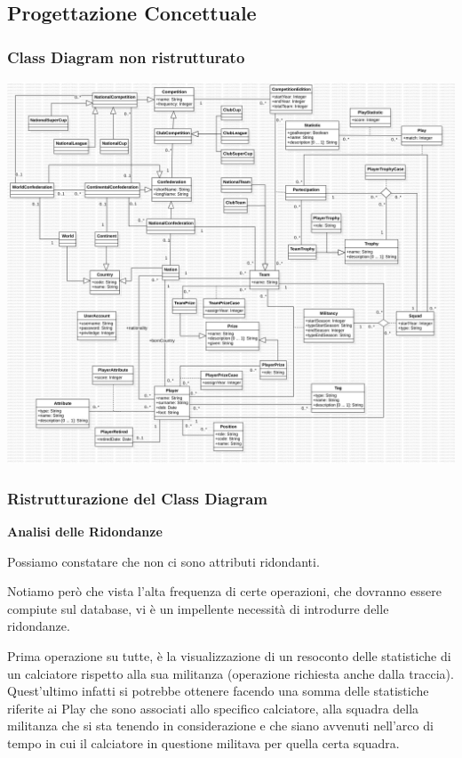 \subsection{\Large Progettazione Concettuale}

\newpage

\subsubsection{\Large Class Diagram non ristrutturato}

\includegraphics[width=\textwidth]{res/class_diagram_not_ristr}
\newpage

\subsubsection{\Large Ristrutturazione del Class Diagram}

\textbf{\large Analisi delle Ridondanze}

Possiamo constatare che non ci sono attributi ridondanti.

Notiamo però che vista l'alta frequenza di certe operazioni, 
che dovranno essere compiute sul database, vi è
un impellente necessità di introdurre delle ridondanze.


Prima operazione su tutte, è la visualizzazione di un 
resoconto delle statistiche di un calciatore rispetto alla 
sua militanza
(operazione richiesta anche dalla traccia).
Quest'ultimo infatti si potrebbe ottenere facendo una somma 
delle  statistiche riferite ai Play che sono associati allo 
specifico calciatore, alla squadra della militanza che si sta 
tenendo in considerazione e che siano avvenuti nell'arco di 
tempo in cui il calciatore in questione militava per quella 
certa squadra.


